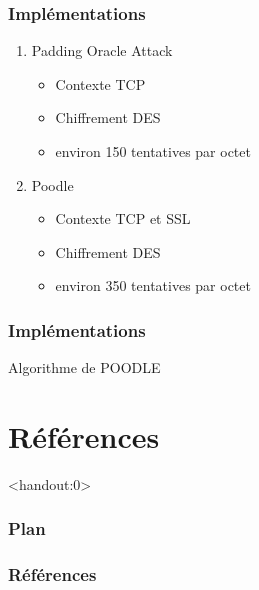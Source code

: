 \begin{frame}
  \frametitle{Implémentations}
  
  \begin{enumerate}
  \item Padding Oracle Attack
    \begin{itemize}
    \item Contexte TCP
    \item Chiffrement DES
    \item environ 150 tentatives par octet
    \end{itemize}
    \pause
  \item Poodle
    \begin{itemize}
    \item Contexte TCP et SSL
    \item Chiffrement DES
    \item environ 350 tentatives par octet
    \end{itemize}
  \end{enumerate}

\end{frame}


\begin{frame}
  \frametitle{Implémentations}
  \begin{block}{Algorithme de POODLE}
    
  \end{block}
\end{frame}


\section{Références}

\begin{frame}<handout:0>
  \frametitle{Plan}
  \tableofcontents[currentsection,subsectionstyle=hide]
\end{frame}

\nocite{*}


\begin{frame}[allowframebreaks]
  \frametitle{Références}
  
\end{frame}

\begin{frame}
  \vfill
  \centering
  \vfill
\end{frame}
